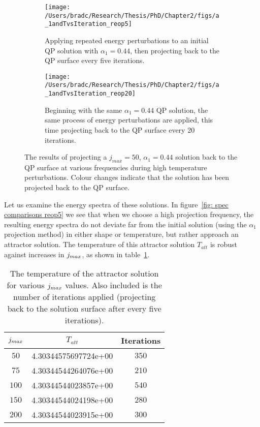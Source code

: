 \documentclass[../PhD.tex]{subfiles}
\begin{document}
\begin{figure}[ht]
	\centering
	\begin{subfigure}[t]{0.47\textwidth}
		\texttt{[image: /Users/bradc/Research/Thesis/PhD/Chapter2/figs/a\_1andTvsIteration\_reop5]}
		\caption{Applying repeated energy perturbations to an initial QP solution with $\alpha_1=0.44$, then projecting back to the QP surface every five iterations.}
		\label{fig: a_1andTa0.2reop5}
	\end{subfigure}
	\hfill
	\begin{subfigure}[t]{0.47\textwidth}
		\texttt{[image: /Users/bradc/Research/Thesis/PhD/Chapter2/figs/a\_1andTvsIteration\_reop20]}
		\caption{Beginning with the same $\alpha_1 = 0.44$ QP solution, the same process of energy perturbations are applied, this time projecting back to the QP surface every 20 iterations.}
		\label{fig: a_1andTa.2reop20}
	\end{subfigure}
	\caption[High temperature solutions resulting from projecting back to the QP solution surface at various frequencies]{The results of projecting a $j_{max}=50$, $\alpha_1 = 0.44$ solution back to the QP surface at various frequencies during high temperature perturbations. Colour changes indicate that the solution has been projected back to the QP surface.}
	\label{fig: reop comparisons}
\end{figure}

Let us examine the energy spectra of these solutions. In figure~\ref{fig: spec comparisons reop5} we see that when we choose a high projection frequency, the resulting energy spectra do not deviate far from the initial solution (using the $\alpha_1$ projection method) in either shape or temperature, but rather approach an attractor solution. The temperature of this attractor solution $T_{att}$ is robust against increases in $j_{max}$, as shown in table~\ref{tab: T_thresh}.

\begin{table}[h]
	\centering
	\begin{tabular}[t]{|c|c|c|}
		\hline
		$j_{max}$ & $T_{att}$ & Iterations \\ \hline
		$50$ & 4.30344575697724e+00 & $350$ \\ \hline
		$75$ & 4.30344544264076e+00 & $210$ \\ \hline
		$100$ & 4.30344544023857e+00 & $540$ \\ \hline
		$150$ & 4.30344544024198e+00 & $280$ \\ \hline
		$200$ & 4.30344544023915e+00 & $300$ \\ \hline
	\end{tabular}
	\caption[Attractor solution temperature for different truncation values with constant projection frequency]{The temperature of the attractor solution for various $j_{max}$ values. Also included is the number of iterations applied (projecting back to the solution surface after every five iterations).}
	\label{tab: T_thresh}
\end{table}
\end{document}
